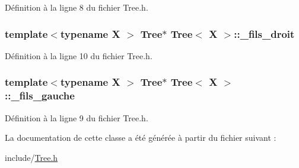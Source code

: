 Définition à la ligne 8 du fichier Tree.h.

\hypertarget{a00015_afd3adaf706139ee52b43262a76400f30}{
\subsubsection[{\_\-fils\_\-droit}]{\setlength{\rightskip}{0pt plus 5cm}template$<$typename X $>$ {\bf Tree}$\ast$ {\bf Tree}$<$ X $>$::{\bf \_\-fils\_\-droit}}}
\label{a00015_afd3adaf706139ee52b43262a76400f30}


Définition à la ligne 10 du fichier Tree.h.

\hypertarget{a00015_a9d6367bd5298cc1a78a6dd994341ada3}{
\subsubsection[{\_\-fils\_\-gauche}]{\setlength{\rightskip}{0pt plus 5cm}template$<$typename X $>$ {\bf Tree}$\ast$ {\bf Tree}$<$ X $>$::{\bf \_\-fils\_\-gauche}}}
\label{a00015_a9d6367bd5298cc1a78a6dd994341ada3}


Définition à la ligne 9 du fichier Tree.h.



La documentation de cette classe a été générée à partir du fichier suivant :\begin{DoxyCompactItemize}
\item 
include/\hyperlink{a00035}{Tree.h}\end{DoxyCompactItemize}
